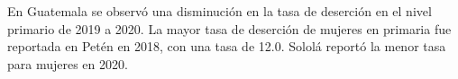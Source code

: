 En Guatemala se observó una disminución en la tasa de deserción en el nivel primario de 2019 a 2020. La mayor tasa de deserción de mujeres en primaria fue reportada en Petén en 2018, con una tasa de 12.0. Sololá reportó la menor tasa para mujeres en 2020. 